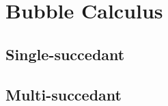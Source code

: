 \setchapterpreamble[u]{\margintoc}
\chapter{Bubble Calculus}

\section{Single-succedant}

\section{Multi-succedant}